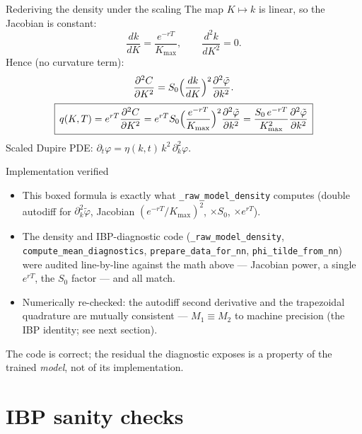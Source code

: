 \documentclass[aspectratio=169,11pt]{beamer}
\begin{document}
\begin{frame}{Rederiving the density under the scaling}
  The map $K\mapsto k$ is linear, so the Jacobian is constant:
  \[
    \frac{dk}{dK}=\frac{e^{-rT}}{K_{\max}},\qquad
    \frac{d^2k}{dK^2}=0.
  \]
  Hence (no curvature term):
  \[
    \frac{\partial^2 C}{\partial K^2}
      = S_0\Bigl(\frac{dk}{dK}\Bigr)^2\frac{\partial^2\tilde\varphi}{\partial k^2}.
  \]
  \[
    \boxed{\,q(K,T)=e^{rT}\frac{\partial^2 C}{\partial K^2}
      =e^{rT}S_0\Bigl(\frac{e^{-rT}}{K_{\max}}\Bigr)^2\frac{\partial^2\tilde\varphi}{\partial k^2}
      =\frac{S_0\,e^{-rT}}{K_{\max}^2}\frac{\partial^2\tilde\varphi}{\partial k^2}\,}
  \]
  {\footnotesize Scaled Dupire PDE: $\partial_t\varphi=\eta(k,t)\,k^2\,\partial_k^2\varphi$.}
\end{frame}

\begin{frame}{Implementation verified}
  \begin{itemize}
    \item This boxed formula is exactly what \texttt{\_raw\_model\_density} computes
          (double autodiff for $\partial_k^2\tilde\varphi$, Jacobian
          $(e^{-rT}/K_{\max})^2$, $\times S_0$, $\times e^{rT}$).
    \item The density and IBP-diagnostic code
          (\texttt{\_raw\_model\_density},
          \texttt{compute\_mean\_diagnostics},
          \texttt{prepare\_data\_for\_nn},
          \texttt{phi\_tilde\_from\_nn})
          were audited line-by-line against the math above --- Jacobian power, a
          single $e^{rT}$, the $S_0$ factor --- and all match.
    \item Numerically re-checked: the autodiff second derivative and the trapezoidal
          quadrature are mutually consistent --- $M_1\equiv M_2$ to machine precision
          (the IBP identity; see next section).
  \end{itemize}
  \vspace{0.3em}
  {\footnotesize The code is correct; the residual the diagnostic exposes is a property
  of the trained \emph{model}, not of its implementation.}
\end{frame}

\section{IBP sanity checks}
\end{document}

